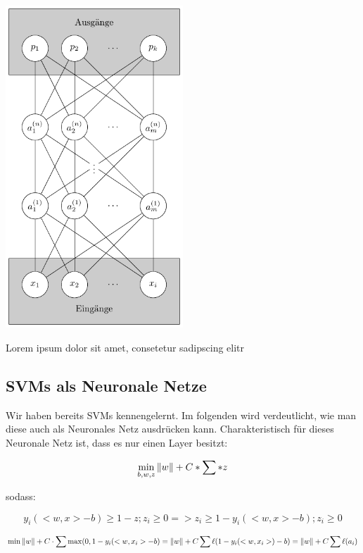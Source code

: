 \begin{dsafigure}
	\begin{center}
		\includegraphics[width=0.5\textwidth]{Figure_NN}
		\caption{Lorem ipsum dolor sit amet, consetetur sadipscing elitr} %
		\label{FigNN}
	\end{center}
\end{dsafigure}

\subsection{SVMs als Neuronale Netze}

Wir haben bereits SVMs kennengelernt. Im folgenden wird verdeutlicht, wie man diese auch als Neuronales Netz ausdrücken kann. Charakteristisch für dieses Neuronale Netz ist, dass es nur einen Layer besitzt:

\begin{equation*}
\min\limits_{b,w,z} \left\lVert w\right\rVert + C * \sum * z
\end {equation*}

sodass:

\begin{equation*}
y_i (<w,x> - b) \geq 1 - z ; z_i \geq 0 => z_i \geq 1- y_i (<w,x> - b); z_i \geq 0
\end {equation*}

\begin{equation*}
\min \left\lVert w\right\rVert + C \cdot \sum \max (0, 1-y_i (<w,x_i>-b) = \left\lVert w\right\rVert + C \sum \ell ( 1-y_i (<w,x_i>)-b) = \left\lVert w\right\rVert + C \sum \ell (a_i)
\end{equation*}

